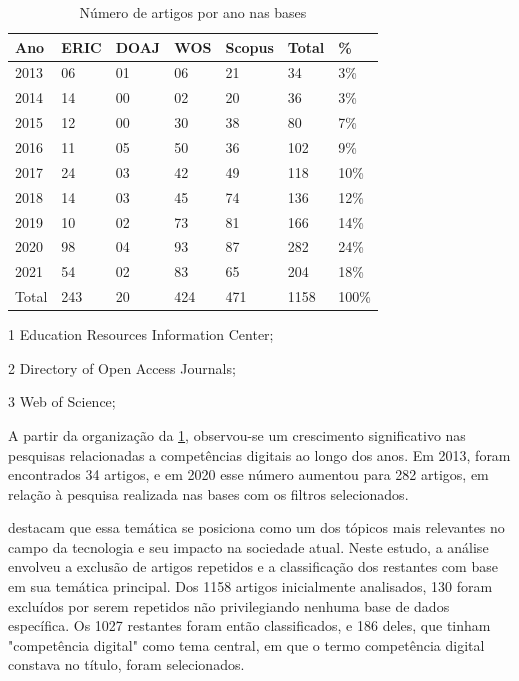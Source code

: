 \documentclass[portuguese]{textolivre}
\begin{document}
\begin{table}[htbp]
\centering
\begin{threeparttable}
    \caption{Número de artigos por ano nas bases}
    \label{tab02}
    \begin{tabular}{lllllll}
    \toprule
    Ano & ERIC\tnote{1} & DOAJ\tnote{2} & WOS\tnote{3} & Scopus & Total & \% \\
    \midrule
2013 & 06 & 01 & 06 & 21 & 34 & 3\% \\
2014 & 14 & 00 & 02 & 20 & 36 & 3\% \\
2015 & 12 & 00 & 30 & 38 & 80 & 7\% \\
2016 & 11 & 05 & 50 & 36 & 102 & 9\% \\
2017 & 24 & 03 & 42 & 49 & 118 & 10\% \\
2018 & 14 & 03 & 45 & 74 & 136 & 12\% \\
2019 & 10 & 02 & 73 & 81 & 166 & 14\% \\
2020 & 98 & 04 & 93 & 87 & 282 & 24\% \\
2021 & 54 & 02 & 83 & 65 & 204 & 18\% \\
Total & 243 & 20 & 424 & 471 & 1158 & 100\% \\
    \bottomrule
    \end{tabular}
    \begin{tablenotes}
    \item[1] Education Resources Information Center;
    \item[2] Directory of Open Access Journals;
    \item[3] Web of Science; 
    \end{tablenotes}
\end{threeparttable}
\end{table}

A partir da organização da \cref{tab02}, observou-se um crescimento
significativo nas pesquisas relacionadas a competências digitais ao
longo dos anos. Em 2013, foram encontrados 34 artigos, e em 2020 esse
número aumentou para 282 artigos, em relação à pesquisa realizada nas
bases com os filtros selecionados.

\textcite{rodriguezgarcia2019} destacam que essa
temática se posiciona como um dos tópicos mais relevantes no campo da
tecnologia e seu impacto na sociedade atual. Neste estudo, a análise
envolveu a exclusão de artigos repetidos e a classificação dos restantes
com base em sua temática principal. Dos 1158 artigos inicialmente
analisados, 130 foram excluídos por serem repetidos não privilegiando
nenhuma base de dados específica. Os 1027 restantes foram então
classificados, e 186 deles, que tinham "competência digital" como tema
central, em que o termo competência digital constava no título, foram
selecionados.
\end{document}
